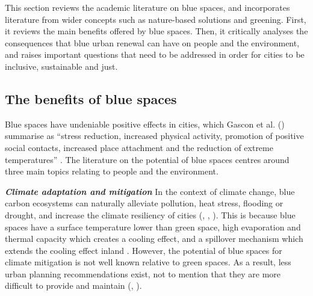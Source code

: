 \documentclass{article}
\newcommand{\bisection}[1]{\textbf{\textit{#1}}}
\begin{document}
This section reviews the academic literature on blue spaces, and incorporates literature from wider concepts such as nature-based solutions and greening. First, it reviews the main benefits offered by blue spaces. Then, it critically analyses the consequences that blue urban renewal can have on people and the environment, and raises important questions that need to be addressed in order for cities to be inclusive, sustainable and just.

\subsection{The benefits of blue spaces}

Blue spaces have undeniable positive effects in cities, which Gascon et al. (\citeyear{gascon2017outdoor}) summarise as ``stress reduction, increased physical activity, promotion of positive social contacts, increased place attachment and the reduction of extreme temperatures'' \parencite{gascon2017outdoor}. The literature on the potential of blue spaces centres around three main topics relating to people and the environment.

\bisection{Climate adaptation and mitigation}
In the context of climate change, blue carbon ecosystems can naturally alleviate pollution, heat stress, flooding or drought, and increase the climate resiliency of cities (\cite{lin2020water}, \cite{manteghi2015water}, \cite{o2021international}). 
This is because blue spaces have a surface temperature lower than green space, high evaporation and thermal capacity which creates a cooling effect, and a spillover mechanism which extends the cooling effect inland \parencite{lin2020water}.
However, the potential of blue spaces for climate mitigation is not well known relative to green spaces. As a result, less urban planning recommendations exist, not to mention that they are more difficult to provide and maintain (\cite{manteghi2015water}, \cite{volker2013evidence}).
\end{document}
